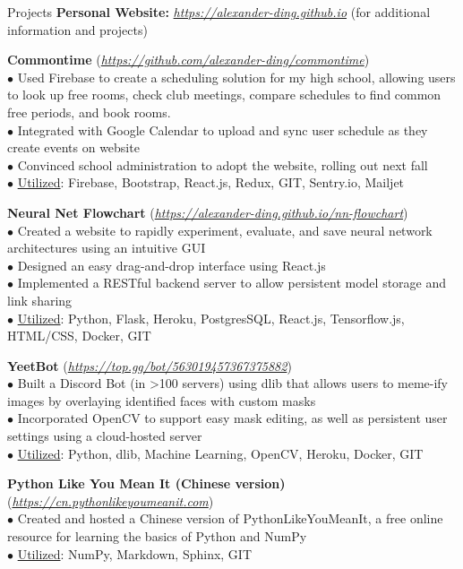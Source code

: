 \documentclass{resume} %
\begin{document}
\begin{rSection}{Projects}
    {\bf Personal Website:} {\small \href{https://alexander-ding.github.io}{\textit{https://alexander-ding.github.io}} (for additional information and projects)}

    {\bf Commontime} {\small (\href{https://github.com/alexander-ding/commontime}{\textit{https://github.com/alexander-ding/commontime}})}
    \\$\bullet$ Used Firebase to create a scheduling solution for my high school, allowing users to look up free rooms, check club meetings, compare schedules to find common free periods, and book rooms.
    \\$\bullet$ Integrated with Google Calendar to upload and sync user schedule as they create events on website
    \\$\bullet$ Convinced school administration to adopt the website, rolling out next fall 
    \\$\bullet$ \underline{Utilized}: Firebase, Bootstrap, React.js, Redux, GIT, Sentry.io, Mailjet

    {\bf Neural Net Flowchart} {\small (\href{https://alexander-ding.github.io/nn-flowchart}{\textit{https://alexander-ding.github.io/nn-flowchart}})}
    \\$\bullet$ Created a website to rapidly experiment, evaluate, and save neural network architectures using an intuitive GUI
    \\$\bullet$ Designed an easy drag-and-drop interface using React.js
    \\$\bullet$ Implemented a RESTful backend server to allow persistent model storage and link sharing
    \\$\bullet$ \underline{Utilized}: Python, Flask, Heroku, PostgresSQL, React.js, Tensorflow.js, HTML/CSS, Docker, GIT
    
    {\bf YeetBot} {\small (\href{https://top.gg/bot/563019457367375882}{\textit{https://top.gg/bot/563019457367375882}})}
    \\$\bullet$ Built a Discord Bot (in >100 servers) using dlib that allows users to meme-ify images by overlaying identified faces with custom masks
    \\$\bullet$ Incorporated OpenCV to support easy mask editing, as well as persistent user settings using a cloud-hosted server
    \\$\bullet$ \underline{Utilized}: Python, dlib, Machine Learning, OpenCV, Heroku, Docker, GIT
    
    {\bf Python Like You Mean It (Chinese version)} {\small (\href{https://cn.pythonlikeyoumeanit.com}{\textit{https://cn.pythonlikeyoumeanit.com}})}
    \\$\bullet$ Created and hosted a Chinese version of PythonLikeYouMeanIt, a free online resource for learning the basics of Python and NumPy
    \\$\bullet$ \underline{Utilized}: NumPy, Markdown, Sphinx, GIT
    
    
    
    \end{rSection}
\end{document}
